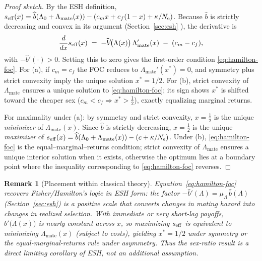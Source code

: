 \documentclass[11pt]{article}
\theoremstyle{upright}
\newtheorem{remark}{Remark}
\newcommand{\Ne}{N_{\mathrm{e}}}
\newcommand{\seff}[1][]{s_{\mathrm{eff}\if\relax\detokenize{#1}\relax\else,#1\fi}}
\newcommand{\teq}{\mathrel{\!=\!}} %
\begin{document}
\begin{proof}[Proof sketch]
By the ESH definition, $\seff(x)=\widehat b(\Lambda_0+\Lambda_{\mathrm{mate}}(x))-(c_m x+c_f(1-x)+\kappa/\Ne)$.
Because $\widehat b$ is strictly decreasing and convex in its argument (Section~\ref{sec:esh} ),
the derivative is
\[
\frac{d}{dx}\seff(x)\;=\;-\widehat b'\!\big(\Lambda(x)\big)\,\Lambda_{\mathrm{mate}}'(x)\;-\;(c_m-c_f),
\]
with $-\widehat b'(\cdot)>0$. Setting this to zero gives the first-order condition \eqref{eq:hamilton-foc}.
For (a), if $c_m=c_f$ the FOC reduces to $\Lambda_{\mathrm{mate}}'(x^{\ast})=0$, and symmetry plus strict convexity
imply the unique solution $x^{\ast}=1/2$. For (b), strict convexity of $\Lambda_{\mathrm{mate}}$ ensures a unique
solution to \eqref{eq:hamilton-foc}; its sign shows $x^{\ast}$ is shifted toward the cheaper sex
($c_m<c_f\Rightarrow x^{\ast}>\tfrac12$), exactly equalizing marginal returns.

\noindent
For maximality under (a): by symmetry and strict convexity, $x\teq\tfrac12$ is the unique \emph{minimizer}
of $\Lambda_{\mathrm{mate}}(x)$. Since $\widehat b$ is strictly decreasing, $x\teq\tfrac12$ is the unique
\emph{maximizer} of $\seff(x)=\widehat b(\Lambda_0+\Lambda_{\mathrm{mate}}(x))-(c+\kappa/\Ne)$.
Under (b), \eqref{eq:hamilton-foc} is the equal–marginal–returns condition; strict convexity of
$\Lambda_{\mathrm{mate}}$ ensures a unique interior solution when it exists, otherwise the optimum
lies at a boundary point where the inequality corresponding to \eqref{eq:hamilton-foc} reverses.
\end{proof}

\begin{remark}[Placement within classical theory]
Equation~\eqref{eq:hamilton-foc} recovers Fisher/Hamilton’s logic in ESH form:
the factor $-\widehat b'(\Lambda)=\mu_\Lambda\,\widehat b(\Lambda)$ (Section~\ref{sec:esh}) is a positive scale
that converts changes in mating hazard into changes in realized selection.
With immediate or very short-lag payoffs, $\widehat b'\!\big(\Lambda(x)\big)$ is nearly constant across $x$,
so maximizing $\seff$ is equivalent to minimizing $\Lambda_{\mathrm{mate}}(x)$ (subject to costs),
yielding $x^{\ast}=1/2$ under symmetry or the equal-marginal-returns rule under asymmetry.
Thus the sex-ratio result is a direct limiting corollary of ESH, not an additional assumption.
\end{remark}

\end{document}
